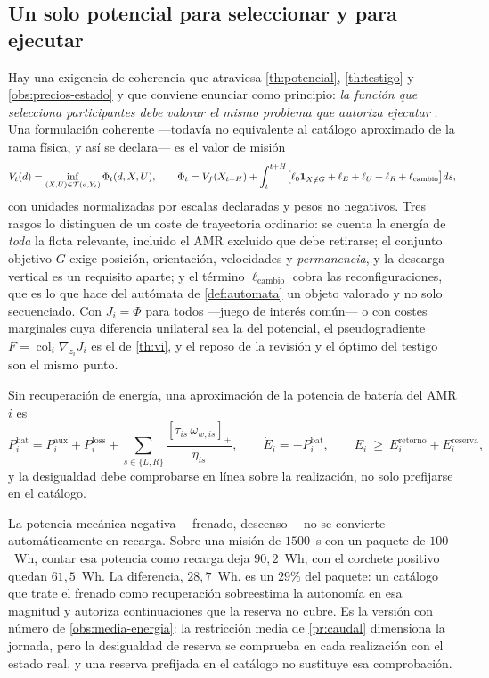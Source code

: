 \subsection{Un solo potencial para seleccionar y para ejecutar}

Hay una exigencia de coherencia que atraviesa \cref{th:potencial},
\cref{th:testigo} y \cref{obs:precios-estado} y que conviene enunciar como
principio: \emph{la función que selecciona participantes debe valorar el mismo
problema que autoriza ejecutar} \cite{mayorga2026m1}. Una formulación coherente
—todavía no equivalente al catálogo aproximado de la rama física, y así se
declara— es el valor de misión
\[
  V_t(d)=\inf_{(X,U)\in\mathcal{T}(d,Y_t)}\Phi_t(d,X,U),
  \qquad
  \Phi_t=V_f(X_{t+H})+\int_t^{t+H}\bigl[\ell_0\mathbf 1_{X\notin G}+\ell_E+\ell_U+\ell_R+\ell_{\mathrm{cambio}}\bigr]ds,
\]
con unidades normalizadas por escalas declaradas y pesos no negativos. Tres
rasgos lo distinguen de un coste de trayectoria ordinario: se cuenta la energía
de \emph{toda} la flota relevante, incluido el AMR excluido que debe retirarse;
el conjunto objetivo $G$ exige posición, orientación, velocidades y
\emph{permanencia}, y la descarga vertical es un requisito aparte; y el término
$\ell_{\mathrm{cambio}}$ cobra las reconfiguraciones, que es lo que hace del
autómata de \cref{def:automata} un objeto valorado y no solo secuenciado. Con
$J_i=\Phi$ para todos —juego de interés común— o con costes marginales cuya
diferencia unilateral sea la del potencial, el pseudogradiente
$F=\operatorname{col}_i\nabla_{z_i}J_i$ es el de \cref{th:vi}, y el reposo de la
revisión y el óptimo del testigo son el mismo punto.

\begin{proposicion}
\label{pr:bateria}
Sin recuperación de energía, una aproximación de la potencia de batería del
AMR $i$ es
\[
  P^{\mathrm{bat}}_i=P^{\mathrm{aux}}_i+P^{\mathrm{loss}}_i
  +\sum_{s\in\{L,R\}}\frac{[\tau_{is}\,\omega_{w,is}]_+}{\eta_{is}},
  \qquad
  \dot E_i=-P^{\mathrm{bat}}_i,
  \qquad
  E_i\ \ge\ E^{\mathrm{retorno}}_i+E^{\mathrm{reserva}}_i ,
\]
y la desigualdad debe comprobarse en línea sobre la realización, no solo
prefijarse en el catálogo.
\end{proposicion}

\begin{observacion}
\label{obs:bateria-num}
La potencia mecánica negativa —frenado, descenso— no se convierte
automáticamente en recarga. Sobre una misión de $1500$~s con un paquete de
$100$~Wh, contar esa potencia como recarga deja $90{,}2$~Wh; con el corchete
positivo quedan $61{,}5$~Wh. La diferencia, $28{,}7$~Wh, es un $29\%$ del paquete:
un catálogo que trate el frenado como recuperación sobreestima la autonomía en
esa magnitud y autoriza continuaciones que la reserva no cubre. Es la versión
con número de \cref{obs:media-energia}: la restricción media de \cref{pr:caudal}
dimensiona la jornada, pero la desigualdad de reserva se comprueba en cada
realización con el estado real, y una reserva prefijada en el catálogo no
sustituye esa comprobación.
\end{observacion}

